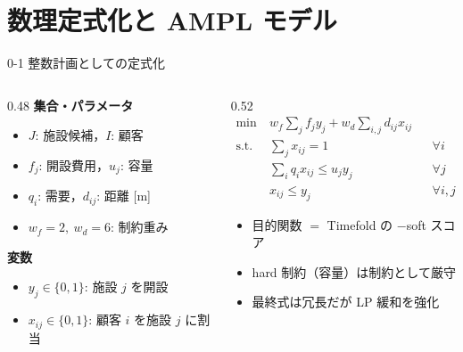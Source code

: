 \documentclass[aspectratio=169,11pt]{beamer}
\begin{document}
\section{数理定式化と AMPL モデル}

\begin{frame}{0-1 整数計画としての定式化}
  \begin{columns}[T]
    \begin{column}{0.48\textwidth}
      \small
      \textbf{集合・パラメータ}
      \begin{itemize}
        \item $J$: 施設候補，$I$: 顧客
        \item $f_j$: 開設費用，$u_j$: 容量
        \item $q_i$: 需要，$d_{ij}$: 距離 [m]
        \item $w_f = 2,\ w_d = 6$: 制約重み
      \end{itemize}
      \textbf{変数}
      \begin{itemize}
        \item $y_j \in \{0,1\}$: 施設 $j$ を開設
        \item $x_{ij} \in \{0,1\}$: 顧客 $i$ を施設 $j$ に割当
      \end{itemize}
    \end{column}
    \begin{column}{0.52\textwidth}
      \small
      \begin{align*}
        \min\ & w_f \sum_{j} f_j y_j + w_d \sum_{i,j} d_{ij} x_{ij} \\
        \text{s.t. }
        & \textstyle\sum_{j} x_{ij} = 1 && \forall i \\
        & \textstyle\sum_{i} q_i x_{ij} \le u_j y_j && \forall j \\
        & x_{ij} \le y_j && \forall i,j
      \end{align*}
      \begin{itemize}
        \item 目的関数 $=$ Timefold の $-$soft スコア
        \item hard 制約（容量）は\alert{制約として厳守}
        \item 最終式は冗長だが LP 緩和を強化
      \end{itemize}
    \end{column}
  \end{columns}
\end{frame}
\end{document}
